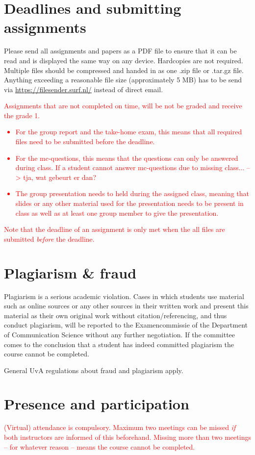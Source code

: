 \documentclass[a4paper,10pt]{report}
\begin{document}
	\section{Deadlines and submitting assignments}
	Please send all assignments and papers as a PDF file to ensure that it can be read and is displayed the same way on any device. Hardcopies are not required. Multiple files should be compressed and handed in as one .zip file or .tar.gz file. Anything exceeding a reasonable file size (approximately 5 MB) has to be send via \url{https://filesender.surf.nl/} instead of direct email. \\
	
	\textcolor{red}{Assignments that are not completed on time, will be not be graded and receive the grade 1. 
		\begin{itemize}
			\item For the group report and the take-home exam, this means that all required files need to be submitted before the deadline. 
			\item For the mc-questions, this means that the questions can only be answered during class. If a student cannot answer mc-questions due to missing class... --> tja, wat gebeurt er dan?
			\item The group presentation needs to held during the assigned class, meaning that slides or any other material used for the presentation needs to be present in class as well as at least one group member to give the presentation. 
		\end{itemize}
		Note that the deadline of an assignment is only met when the all files are submitted \emph{before} the deadline.}

	\section{Plagiarism \& fraud}
	Plagiarism is a serious academic violation. Cases in which students use material such as online sources or any other sources in their written work and present this material as their own original work without citation/referencing, and thus conduct plagiarism, will be reported to the Examencommissie of the Department of Communication Science without any further negotiation. If the committee comes to the conclusion that a student has indeed committed plagiarism the course cannot be completed. 

	General UvA regulations about fraud and plagiarism apply.

	\section{Presence and participation}
	\textcolor{red}{(Virtual) attendance is compulsory. Maximum two meetings can be missed \emph{if} both instructors are informed of this beforehand. Missing more than two meetings – for whatever reason – means the course cannot be completed.} 
	
\end{document}
